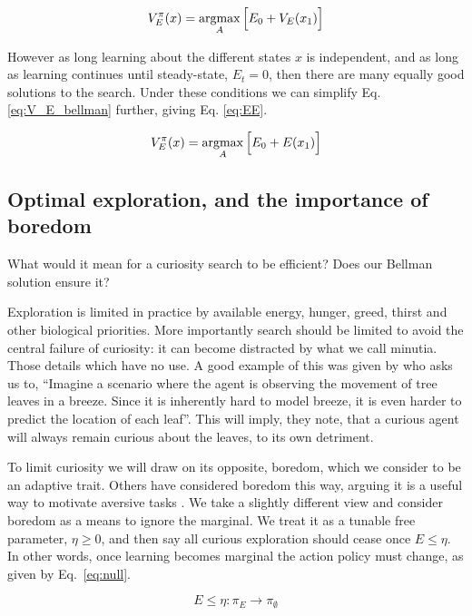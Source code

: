 \begin{equation}
	\label{eq:V_E_bellman} 
	V^{\pi}_E(x) = \operatorname*{argmax}_A \Big [ E_0 + V_E(x_1) \Big ]
\end{equation}

However as long learning about the different states $x$ is independent, and as long as learning continues until steady-state, $E_t =0$, then there are many equally good solutions to the search. Under these conditions we can simplify Eq. \ref{eq:V_E_bellman} further, giving Eq. \ref{eq:EE}. 

\begin{equation}
	\label{eq:EE} 
	V^{\pi}_E(x) = \operatorname*{argmax}_A \Big [ E_0 + E(x_1) \Big ]
\end{equation}

\subsection{Optimal exploration, and the importance of boredom}
What would it mean for a curiosity search to be efficient? Does our Bellman solution ensure it?

Exploration is limited in practice by available energy, hunger, greed, thirst and other biological priorities. More importantly search should be limited to avoid the central failure of curiosity: it can become distracted by what we call minutia. Those details which have no use. A good example of this was given by \cite{Pathak2017} who asks us to, ``Imagine a scenario where the agent is observing the movement of tree leaves in a breeze. Since it is inherently hard to model breeze, it is even harder to predict the location of each leaf''. This will imply, they note, that a curious agent will always remain curious about the leaves, to its own detriment. 

To limit curiosity we will draw on its opposite, boredom, which we consider to be an adaptive trait. Others have considered boredom this way, arguing it is a useful way to motivate aversive tasks \citep{Bench2013}. We take a slightly different view and consider boredom as a means to ignore the marginal. We treat it as a tunable free parameter, $\eta \ge 0$, and then say all curious exploration should cease once $E \le \eta$. In other words, once learning becomes marginal the action policy must change, as given by Eq.~\ref{eq:null}. 

\begin{equation}
	\label{eq:null}
	E \le \eta : \pi_E \rightarrow \pi_{\emptyset}
\end{equation}

